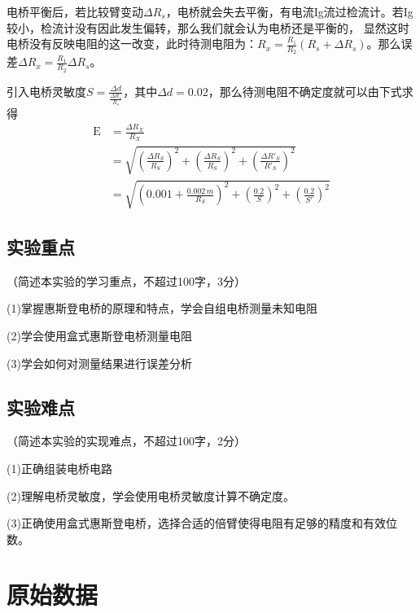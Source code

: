 \documentclass[10pt,a4paper]{ctexart}
\newcommand{\myspace}[1]{\par\vspace{#1\baselineskip}} %
\newcommand{\xiaosi}{\fontsize{12pt}{16pt}\selectfont}
\begin{document}
    电桥平衡后，若比较臂变动$\Delta R_s$，电桥就会失去平衡，有电流Ig流过检流计。若Ig较小，检流计没有因此发生偏转，那么我们就会认为电桥还是平衡的，
    显然这时电桥没有反映电阻的这一改变，此时待测电阻为：$R_x=\frac{R_1}{R_2}(R_s+\Delta R_s)$。那么误差$\Delta R_x=\frac{R_1}{R_2}\Delta R_s$。

    引入电桥灵敏度$S=\frac{\Delta d}{\frac{\Delta R_s}{R_s}}$，其中$\Delta d=0.02$，那么待测电阻不确定度就可以由下式求得
   \begin{align}
\mathrm{E} &= \frac{\Delta R_X}{R_X} \\
           &= \sqrt{
                \left( \frac{\Delta R_S}{R_S} \right)^2 
              + \left( \frac{\Delta R_S}{R_S} \right)^2 
              + \left( \frac{\Delta R'_S}{R'_S} \right)^2
              } \\
           &= \sqrt{
                \left( 0.001 + \frac{0.002\,m}{R_S} \right)^2 
              + \left( \frac{0.2}{S} \right)^2 
              + \left( \frac{0.2}{S'} \right)^2
              }
\end{align}

    \myspace{2}
    
    
    \subsection{实验重点}
    
    \xiaosi（简述本实验的学习重点，不超过100字，3分）
    
    (1)掌握惠斯登电桥的原理和特点，学会自组电桥测量未知电阻

    (2)学会使用盒式惠斯登电桥测量电阻

    (3)学会如何对测量结果进行误差分析
    \myspace{2}
    
    \subsection{实验难点}
    
    \xiaosi（简述本实验的实现难点，不超过100字，2分）

    (1)正确组装电桥电路

    (2)理解电桥灵敏度，学会使用电桥灵敏度计算不确定度。

    (3)正确使用盒式惠斯登电桥，选择合适的倍臂使得电阻有足够的精度和有效位数。
\myspace{2}
\section{原始数据}
\end{document}
